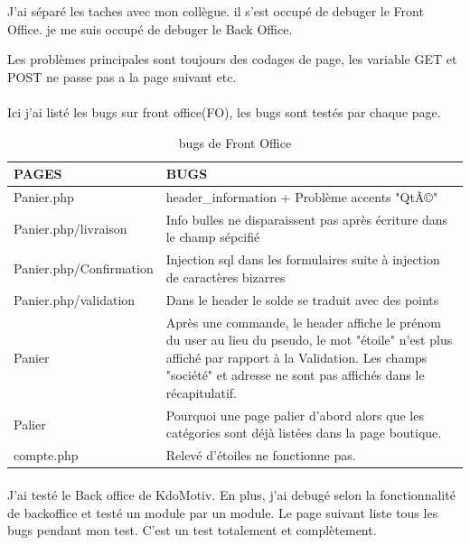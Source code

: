 J'ai séparé les taches avec mon collègue. il s'est occupé de debuger le Front Office. je me suis occupé de debuger le Back Office.

Les problèmes principales sont toujours des codages de page, les variable GET et POST ne passe pas a la page suivant etc.


\paragraph{}
Ici j'ai listé les bugs sur front office(FO), les bugs sont testés par chaque page. 

\begin{table}[htbp]
\renewcommand{\tabularxcolumn}[1]{>{\arraybackslash}m{#1}}
\begin{tabularx}{\textwidth}{lX}
\hline 
PAGES
 & BUGS
 \\ 
\hline 
Panier.php
 & header\_information + Problème accents "QtÃ©"
 \\ 
\hline 
Panier.php/livraison
 & Info bulles ne disparaissent pas après écriture dans le champ sépcifié
 \\ 
\hline 
Panier.php/Confirmation
 & Injection sql dans les formulaires suite à injection de caractères bizarres
 \\ 
\hline 
Panier.php/validation
 & Dans le header le solde se traduit avec des points
 \\ 
\hline 
Panier
 & Après une commande, le header affiche le prénom du user au lieu du pseudo, le mot "étoile" n'est plus affiché par rapport à la Validation. Les champs "société" et adresse ne sont pas affichés dans le récapitulatif.
 \\ 
\hline 
Palier
 & Pourquoi une page palier  d'abord alors que les catégories sont déjà listées dans la page boutique.
 \\ 
\hline 
compte.php
 & Relevé d'étoiles ne fonctionne pas.
 \\ 
\hline 
\end{tabularx} 
 \caption{bugs de Front Office}
\end{table}

\paragraph{}
J'ai testé le Back office de KdoMotiv. En plus, j'ai debugé selon la fonctionnalité de backoffice et testé un module par un module. Le page suivant liste tous les bugs pendant mon test. C'est un test totalement et complètement. 

